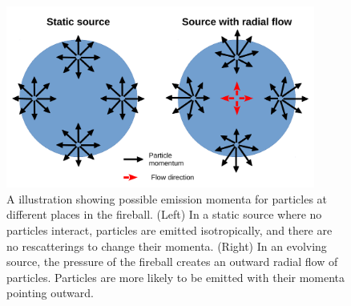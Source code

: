\begin{figure}[hbtp]
\includegraphics[width=24pc]{Figures/HomemadeFigures/FlowAndMomentum.pdf}
\caption[Effect of radial flow on momentum]{A illustration showing possible emission momenta for particles at different places in the fireball.
(Left) In a static source where no particles interact, particles are emitted isotropically, and there are no rescatterings to change their momenta.
(Right) In an evolving source, the pressure of the fireball creates an outward radial flow of particles.
Particles are more likely to be emitted with their momenta pointing outward.}
\label{fig:FlowAndMomentum}
\end{figure}

